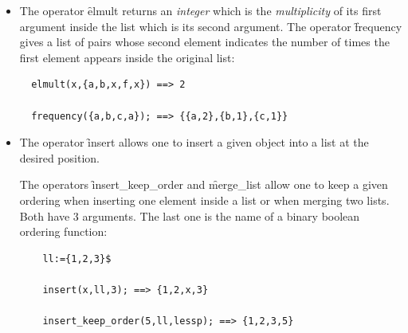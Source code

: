 \begin{itemize}
\begin{verbatim}
  remove({a,b,x,f,x},3); ==> {a,b,f,x}

  delete_all(x,{a,b,x,f,x}); ==> {a,b,f}

  delpair(a,{{a,1},{b,2},{c,3}}; ==> {{b,2},{c,3}}
\end{verbatim}
\item[iv.]
  \hypertarget{operator:ELMULT}{}
  \hypertarget{operator:FREQUENCY}{}
The operator \f{elmult} returns an \emph{integer} which is the
\emph{multiplicity} of its first argument inside the list which is its
second argument.
The operator \f{frequency} gives a list of pairs
whose second element indicates the number of times the first element
appears inside the original list:
\begin{verbatim}
  elmult(x,{a,b,x,f,x}) ==> 2

  frequency({a,b,c,a}); ==> {{a,2},{b,1},{c,1}}
\end{verbatim}
\item[v.]
  \hypertarget{operator:INSERT}{}
  \hypertarget{operator:INSERT_KEEP_ORDER}{}
  \hypertarget{operator:MERGE_LIST}{}
The operator \f{insert} allows one to insert a given object into a list
at the desired position.

The operators \f{insert\_keep\_order} and \f{merge\_list} allow one to
keep a given ordering when inserting one element inside a list or
when merging two lists. Both have 3 arguments. The last one  is
the name of a binary boolean ordering function:
\begin{verbatim}
    ll:={1,2,3}$

    insert(x,ll,3); ==> {1,2,x,3}

    insert_keep_order(5,ll,lessp); ==> {1,2,3,5}


\end{verbatim}
\end{itemize}
